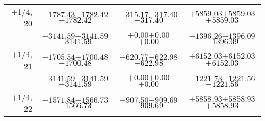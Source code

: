 \documentclass[compress]{beamer}
\begin{document}
\begin{frame}
{\begin{tabular}{r | c | c | c}
$+$1/4, 20 & $-1787.43$\hspace{0.1 cm}$-1782.42$\hspace{0.1 cm}\textcolor{black}{$-1782.42$} & $-315.17$\hspace{0.1 cm}$-317.40$\hspace{0.1 cm}\textcolor{black}{$-317.40$} & $+5859.03$\hspace{0.1 cm}$+5859.03$\hspace{0.1 cm}\textcolor{black}{$+5859.03$} \\
           & $-3141.59$\hspace{0.1 cm}$-3141.59$\hspace{0.1 cm}\textcolor{black}{$-3141.59$} & $+0.00$\hspace{0.1 cm}$+0.00$\hspace{0.1 cm}\textcolor{black}{$+0.00$} & $-1396.26$\hspace{0.1 cm}$-1396.09$\hspace{0.1 cm}\textcolor{black}{$-1396.09$} \\
$+$1/4, 21 & $-1705.54$\hspace{0.1 cm}$-1700.48$\hspace{0.1 cm}\textcolor{black}{$-1700.48$} & $-620.77$\hspace{0.1 cm}$-622.98$\hspace{0.1 cm}\textcolor{black}{$-622.98$} & $+6152.03$\hspace{0.1 cm}$+6152.03$\hspace{0.1 cm}\textcolor{black}{$+6152.03$} \\
           & $-3141.59$\hspace{0.1 cm}$-3141.59$\hspace{0.1 cm}\textcolor{black}{$-3141.59$} & $+0.00$\hspace{0.1 cm}$+0.00$\hspace{0.1 cm}\textcolor{black}{$+0.00$} & $-1221.73$\hspace{0.1 cm}$-1221.56$\hspace{0.1 cm}\textcolor{black}{$-1221.56$} \\
$+$1/4, 22 & $-1571.84$\hspace{0.1 cm}$-1566.73$\hspace{0.1 cm}\textcolor{black}{$-1566.73$} & $-907.50$\hspace{0.1 cm}$-909.69$\hspace{0.1 cm}\textcolor{black}{$-909.69$} & $+5858.93$\hspace{0.1 cm}$+5858.93$\hspace{0.1 cm}\textcolor{black}{$+5858.93$} \\

\end{tabular}}
\end{frame}
\end{document}
